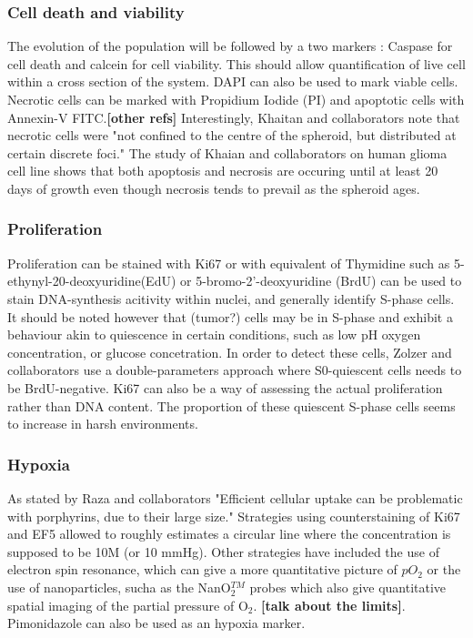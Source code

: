 \documentclass[11pt,a4paper]{article}
\begin{document}
\subsubsection{Cell death and viability}
The evolution of the population will be followed by a two markers : Caspase for cell death and calcein for cell viability. This should allow quantification of live cell within a cross section of the system. DAPI can also be used to mark viable cells.
Necrotic cells can be marked with Propidium Iodide (PI)  and apoptotic cells with Annexin-V FITC.\cite{Khaitan2006}\textbf{[other refs]} Interestingly, Khaitan and collaborators note that necrotic cells were "not confined to the centre of the spheroid, but distributed at certain discrete foci."\cite{Khaitan2006} The study of Khaian and collaborators on human glioma cell line shows that both apoptosis and necrosis are occuring until at least 20 days of growth even though necrosis tends to prevail as the spheroid ages. 

\subsubsection{Proliferation}
Proliferation can be stained with Ki67 \cite{Grimes2014}\cite{Ghaffarizadeh2017} or with equivalent of Thymidine such as 5-ethynyl-20-deoxyuridine(EdU) or  5-bromo-2'-deoxyuridine (BrdU) can be used to stain DNA-synthesis acitivity within nuclei, and generally identify S-phase cells. It should be noted however that (tumor?) cells may be in S-phase and exhibit a behaviour akin to quiescence in certain conditions, such as low pH oxygen concentration, or glucose concetration. \cite{Zolzer1999}\cite{Khaitan2006} In order to detect these cells, Zolzer and collaborators use a double-parameters approach where S0-quiescent cells needs to be BrdU-negative. Ki67 can also be a way of assessing the actual proliferation rather than DNA content. The proportion of these quiescent S-phase cells seems to increase in harsh environments.

\subsubsection{Hypoxia}
As stated by Raza and collaborators "Efficient cellular uptake can be problematic with porphyrins, due to their large size."\cite{Raza2017} Strategies using counterstaining of Ki67 and EF5 allowed to roughly estimates a circular line where the concentration is supposed to be 10\textmu M (or 10 mmHg)\cite{Grimes2014}\cite{Mao2018}. Other strategies have included the use of electron spin resonance\cite{Hashem2015}, which can give a more quantitative picture of $pO_2$ or the use of nanoparticles, sucha as the NanO$_2^{TM}$ probes which also give quantitative spatial imaging of the partial pressure of O$_2$.\cite{Dmitriev2014} \textbf{[talk about the limits]}. Pimonidazole can also be used  as an hypoxia marker. \cite{Onozato2017}
\end{document}
